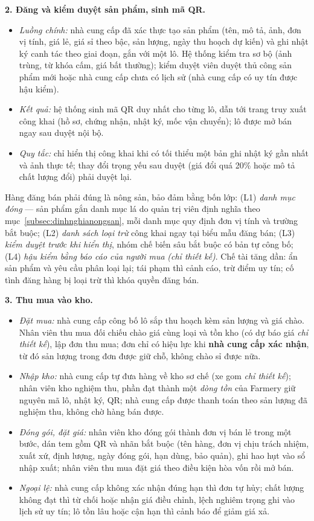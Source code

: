 \noindent\textbf{2. Đăng và kiểm duyệt sản phẩm, sinh mã QR.}
\begin{itemize}
    \item \emph{Luồng chính:} nhà cung cấp đã xác thực tạo sản phẩm (tên, mô tả, ảnh, đơn vị tính, giá lẻ, giá sỉ theo bậc, sản lượng, ngày thu hoạch dự kiến) và ghi nhật ký canh tác theo giai đoạn, gắn với một lô. Hệ thống kiểm tra sơ bộ (ảnh trùng, từ khóa cấm, giá bất thường); kiểm duyệt viên duyệt thủ công sản phẩm mới hoặc nhà cung cấp chưa có lịch sử (nhà cung cấp có uy tín được hậu kiểm).
    \item \emph{Kết quả:} hệ thống sinh mã QR duy nhất cho từng lô, dẫn tới trang truy xuất công khai (hồ sơ, chứng nhận, nhật ký, mốc vận chuyển); lô được mở bán ngay sau duyệt nội bộ.
    \item \emph{Quy tắc:} chỉ hiển thị công khai khi có tối thiểu một bản ghi nhật ký gần nhất và ảnh thực tế; thay đổi trọng yếu sau duyệt (giá đổi quá 20\% hoặc mô tả chất lượng đổi) phải duyệt lại.
\end{itemize}
Hàng đăng bán phải đúng là nông sản, bảo đảm bằng bốn lớp: (L1) \emph{danh mục đóng} --- sản phẩm gắn danh mục lá do quản trị viên định nghĩa theo mục~\ref{subsec:dinhnghianongsan}, mỗi danh mục quy định đơn vị tính và trường bắt buộc; (L2) \emph{danh sách loại trừ} công khai ngay tại biểu mẫu đăng bán; (L3) \emph{kiểm duyệt trước khi hiển thị}, nhóm chế biến sâu bắt buộc có bản tự công bố; (L4) \emph{hậu kiểm bằng báo cáo của người mua} \emph{(chỉ thiết kế)}. Chế tài tăng dần: ẩn sản phẩm và yêu cầu phân loại lại; tái phạm thì cảnh cáo, trừ điểm uy tín; cố tình đăng hàng bị loại trừ thì khóa quyền đăng bán.

\noindent\textbf{3. Thu mua vào kho.}
\begin{itemize}
    \item \emph{Đặt mua:} nhà cung cấp công bố lô sắp thu hoạch kèm sản lượng và giá chào. Nhân viên thu mua đối chiếu chào giá cùng loại và tồn kho (có dự báo giá \emph{chỉ thiết kế}), lập đơn thu mua; đơn chỉ có hiệu lực khi \textbf{nhà cung cấp xác nhận}, từ đó sản lượng trong đơn được giữ chỗ, không chào sỉ được nữa.
    \item \emph{Nhập kho:} nhà cung cấp tự đưa hàng về kho sơ chế (xe gom \emph{chỉ thiết kế}); nhân viên kho nghiệm thu, phần đạt thành một \emph{dòng tồn} của Farmery giữ nguyên mã lô, nhật ký, QR; nhà cung cấp được thanh toán theo sản lượng đã nghiệm thu, không chờ hàng bán được.
    \item \emph{Đóng gói, đặt giá:} nhân viên kho đóng gói thành đơn vị bán lẻ trong một bước, dán tem gồm QR và nhãn bắt buộc (tên hàng, đơn vị chịu trách nhiệm, xuất xứ, định lượng, ngày đóng gói, hạn dùng, bảo quản), ghi hao hụt vào sổ nhập xuất; nhân viên thu mua đặt giá theo điều kiện hòa vốn rồi mở bán.
    \item \emph{Ngoại lệ:} nhà cung cấp không xác nhận đúng hạn thì đơn tự hủy; chất lượng không đạt thì từ chối hoặc nhận giá điều chỉnh, lệch nghiêm trọng ghi vào lịch sử uy tín; lô tồn lâu hoặc cận hạn thì cảnh báo để giảm giá xả.
\end{itemize}

